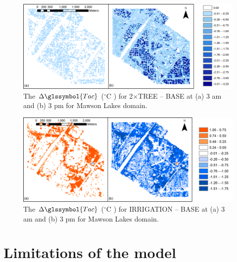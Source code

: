 \documentclass[final,3p,times,authoryear]{elsarticle}
\newcommand{\degreeC}{\ensuremath{^\circ}C }
\begin{document}
\begin{figure}[!htbp]
\includegraphics[width=1.0\textwidth,keepaspectratio]{figure9.png}
 \caption{The $\Delta \glssymbol{Tac}$ (\degreeC) for 2$\times$TREE -- BASE at (a) 3 am and (b) 3 pm for Mawson Lakes domain.} \label{fig:tree_scen}


\end{figure}

\begin{figure}[!htbp]
\includegraphics[width=1.0\textwidth,keepaspectratio]{figure10.png}
 \caption{The $\Delta \glssymbol{Tac}$ (\degreeC) for IRRIGATION -- BASE  at (a) 3 am and (b) 3 pm for Mawson Lakes domain.} \label{fig:irr_scen}


\end{figure}



\section{Limitations of the model}


\end{document}
